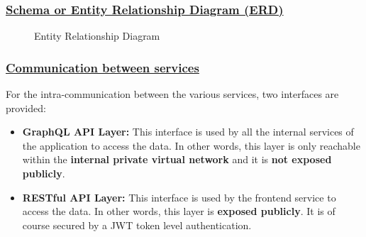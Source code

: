 \subsubsection*{\underline{Schema or Entity Relationship Diagram (ERD)}}
\begin{figure}[H]
	\centering
	\caption{Entity Relationship Diagram}
	\label{fig:entity-relationship-diagram}
\end{figure}
\newpage

\subsubsection*{\underline{Communication between services}}
For the intra-communication between the various services, two interfaces are provided:
\begin{itemize}
	\item \textbf{GraphQL API Layer:}
	      This interface is used by all the internal services of the application to access the data.
	      In other words, this layer is only reachable within the \textbf{internal private virtual network} and it is \textbf{not exposed publicly}.
	\item \textbf{RESTful API Layer:}
	      This interface is used by the frontend service to access the data. In other words, this layer is \textbf{exposed publicly}.
	      It is of course secured by a JWT token level authentication.
\end{itemize}

